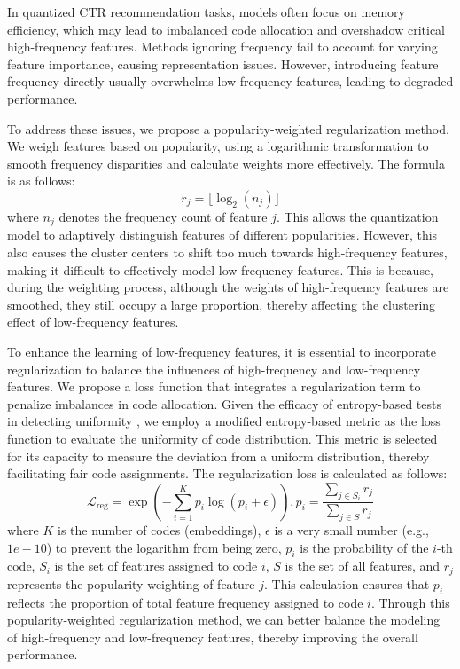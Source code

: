         In quantized CTR recommendation tasks, models often focus on memory efficiency, which may lead to imbalanced code allocation and overshadow critical high-frequency features. 
        Methods ignoring frequency fail to account for varying feature importance, causing representation issues. 
        However, introducing feature frequency directly usually overwhelms low-frequency features, leading to degraded performance. 
        
        To address these issues, we propose a popularity-weighted regularization method. We weigh features based on popularity, using a logarithmic transformation to smooth frequency disparities and calculate weights more effectively.
        The formula is as follows:
        \begin{equation}
        r_j = \lfloor \log_2 (n_j) \rfloor
        \end{equation}
        where $n_j$ denotes the frequency count of feature $j$.
        This allows the quantization model to adaptively distinguish features of different popularities. 
        However, this also causes the cluster centers to shift too much towards high-frequency features, making it difficult to effectively model low-frequency features. This is because, during the weighting process, although the weights of high-frequency features are smoothed, they still occupy a large proportion, thereby affecting the clustering effect of low-frequency features.

        To enhance the learning of low-frequency features, it is essential to incorporate regularization to balance the influences of high-frequency and low-frequency features. 
        We propose a loss function that integrates a regularization term to penalize imbalances in code allocation. 
        Given the efficacy of entropy-based tests in detecting uniformity \cite{dudewicz1981entropy}, we employ a modified entropy-based metric as the loss function to evaluate the uniformity of code distribution. This metric is selected for its capacity to measure the deviation from a uniform distribution, thereby facilitating fair code assignments.
        The regularization loss is calculated as follows:
        \begin{equation}
        \mathcal{L}_{\text{reg}} = \exp\left(-\sum_{i=1}^{K} p_i \log(p_i + \epsilon)\right), p_i = \frac{\sum_{j \in S_i} r_j}{\sum_{j \in S} r_j}
        \label{eq:loss_reg}
        \end{equation}
        where $K$ is the number of codes (embeddings), $\epsilon$ is a very small number (e.g., $1e-10$) to prevent the logarithm from being zero, $p_i$ is the probability of the $i$-th code, $S_i$ is the set of features assigned to code $i$, $S$ is the set of all features, and $r_j$ represents the popularity weighting of feature $j$. This calculation ensures that $p_i$ reflects the proportion of total feature frequency assigned to code $i$.
        Through this popularity-weighted regularization method, we can better balance the modeling of high-frequency and low-frequency features, thereby improving the overall performance.
        
